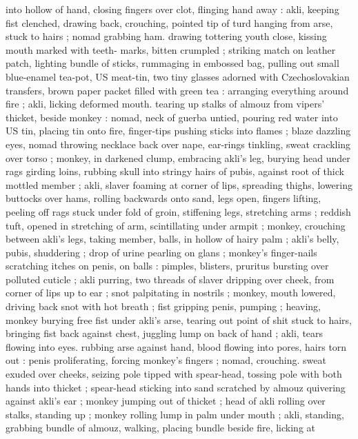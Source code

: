 {into hollow of hand, closing fingers over clot, flinging hand away : 
akli, keeping fist clenched, drawing back, crouching, pointed tip of 
turd hanging from arse, stuck to hairs ; nomad grabbing ham. 
drawing tottering youth close, kissing mouth marked with teeth- 
marks, bitten crumpled ; striking match on leather patch, lighting 
bundle of sticks, rummaging in embossed bag, pulling out small 
blue-enamel tea-pot, US meat-tin, two tiny glasses adorned with 
Czechoslovakian transfers, brown paper packet filled with green tea 
: arranging everything around fire ; akli, licking deformed mouth. 
tearing up stalks of almouz from vipers' thicket, beside monkey : 
nomad, neck of guerba untied, pouring red water into US tin, placing 
tin onto fire, finger-tips pushing sticks into flames ; blaze dazzling 
eyes, nomad throwing necklace back over nape, ear-rings tinkling, 
sweat crackling over torso ; monkey, in darkened clump, embracing 
akli's leg, burying head under rags girding loins, rubbing skull into 
stringy hairs of pubis, against root of thick mottled member ; akli, 
slaver foaming at corner of lips, spreading thighs, lowering buttocks 
over hams, rolling backwards onto sand, legs open, fingers lifting, 
peeling off rags stuck under fold of groin, stiffening legs, stretching 
arms ; reddish tuft, opened in stretching of arm, scintillating under 
armpit ; monkey, crouching between akli's legs, taking member, balls, 
in hollow of hairy palm ; akli's belly, pubis, shuddering ; drop of 
urine pearling on glans ; monkey's finger-nails scratching itches on 
penis, on balls : pimples, blisters, pruritus bursting over polluted 
cuticle ; akli purring, two threads of slaver dripping over cheek, from 
corner of lips up to ear ; snot palpitating in nostrils ; monkey, mouth 
lowered, driving back snot with hot breath ; fist gripping penis, 
pumping ; heaving, monkey burying free fist under akli's arse, 
tearing out point of shit stuck to hairs, bringing fist back against 
chest, juggling lump on back of hand ; akli, tears flowing into eyes. 
rubbing arse against hand, blood flowing into pores, hairs torn out : 
penis proliferating, forcing monkey's fingers ; nomad, crouching. 
sweat exuded over cheeks, seizing pole tipped with spear-head, 
tossing pole with both hands into thicket ; spear-head sticking into 
sand scratched by almouz quivering against akli's ear ; monkey 
jumping out of thicket ; head of akli rolling over stalks, standing up 
; monkey rolling lump in palm under mouth ; akli, standing, grabbing 
bundle of almouz, walking, placing bundle beside fire, licking at 
}
